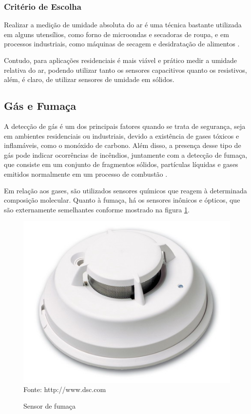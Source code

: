 \subsubsection{Critério de Escolha}
Realizar a medição de umidade absoluta do ar é uma técnica bastante utilizada em alguns utensílios, como forno
de microondas e secadoras de roupa, e em processos industriais, como máquinas de secagem e desidratação de
alimentos \cite{fontesII2005}.

Contudo, para aplicações residenciais é mais viável e prático medir a umidade relativa do ar, podendo utilizar
tanto os sensores capacitivos quanto os resistivos, além, é claro, de utilizar sensores de umidade em sólidos.

\subsection{Gás e Fumaça}
A detecção de gás é um dos principais fatores quando se trata de segurança, seja em ambientes residenciais ou
industriais, devido a existência de gases tóxicos e inflamáveis, como o monóxido de carbono. Além disso, a
presença desse tipo de gás pode indicar ocorrências de incêndios, juntamente com a detecção de fumaça, que
consiste em um conjunto de fragmentos sólidos, partículas líquidas e gases emitidos normalmente em um
processo de combustão \cite{mulholland1995}.

Em relação aos gases, são utilizados sensores químicos que reagem à determinada composição molecular. Quanto à
fumaça, há os sensores inônicos e ópticos, que são externamente semelhantes conforme mostrado na figura
\ref{figura:smoke}.

\begin{figure}[h]
	\caption{Sensor de fumaça}
	\centering
	\includegraphics[scale=0.35]{../images/smoke.jpg}
	\hspace{\linewidth}
	Fonte: http://www.dsc.com
	\label{figura:smoke}
\end{figure}

